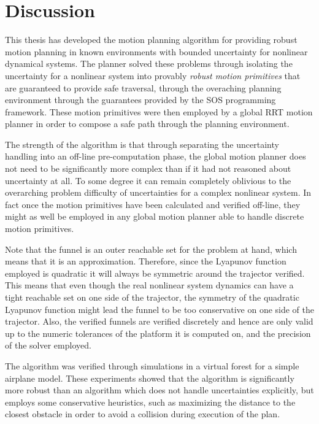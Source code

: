 \chapter{Discussion}
\label{chp:discussion}

This thesis has developed the \rrtfunnel{} motion planning algorithm for
providing robust motion planning in known environments with bounded uncertainty
for nonlinear dynamical systems. The planner solved these problems through
isolating the uncertainty for a nonlinear system into provably \textit{robust
  motion primitives} that are guaranteed to provide safe traversal, through the
overaching planning environment through the guarantees provided by the \ac{SOS}
programming framework. These motion primitives were then employed by a global
\ac{RRT} motion planner in order to compose a safe path through the planning
environment.

The strength of the algorithm is that through separating the uncertainty
handling into an off-line pre-computation phase, the global motion planner does
not need to be significantly more complex than if it had not reasoned about
uncertainty at all. To some degree it can remain completely oblivious to the
overarching problem difficulty of uncertainties for a complex nonlinear system.
In fact once the motion primitives have been calculated and verified off-line,
they might as well be employed in any global motion planner able to handle
discrete motion primitives.


Note that the funnel is an outer reachable set for the problem at hand, which
means that it is an approximation. Therefore, since the Lyapunov function
employed is quadratic it will always be symmetric around the trajector verified.
This means that even though the real nonlinear system dynamics can have a tight
reachable set on one side of the trajector, the symmetry of the quadratic
Lyapunov function might lead the funnel to be too conservative on one side of
the trajector. Also, the verified funnels are verified discretely and hence are
only valid up to the numeric tolerances of the platform it is computed on, and
the precision of the solver employed.


The algorithm was verified through simulations in a virtual forest for a simple
airplane model. These experiments showed that the \rrtfunnel{} algorithm is
significantly more robust than an algorithm which does not handle uncertainties
explicitly, but employs some conservative heuristics, such as maximizing the
distance to the closest obstacle in order to avoid a collision during execution
of the plan.


